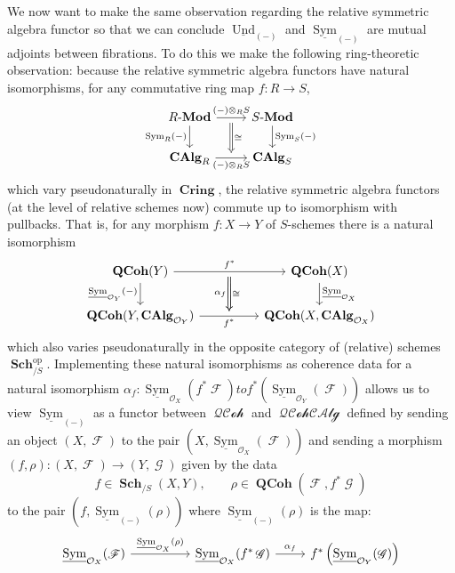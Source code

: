 \documentclass{amsart}
\theoremstyle{definition}
\DeclareMathOperator{\Fscr}{\mathscr{F}}
\DeclareMathOperator{\Gscr}{\mathscr{G}}
\DeclareMathOperator{\Ocal}{\mathcal{O}}
\DeclareMathOperator{\sym}{Sym}
\DeclareMathOperator{\Cring}{\mathbf{Cring}}
\DeclareMathOperator{\op}{op}
\DeclareMathOperator{\und}{Und}
\newcommand{\CAlg}[1]{\mathbf{CAlg}_{#1}}
\newcommand{\Sym}[1]{\sym_{#1}}
\newcommand{\RelSym}[1]{\underline{\sym}_{{#1}}}
\newcommand{\RelUnd}[1]{\underline{\und}_{{#1}}}
\DeclareMathOperator{\Sch}{\mathbf{Sch}}
\DeclareMathOperator{\QCoh}{\mathbf{QCoh}}
\DeclareMathOperator{\QQCoh}{\mathcal{QCoh}}
\DeclareMathOperator{\QQCAlg}{\mathcal{QCohCAlg}}
\newcommand{\Mod}[1]{{#1}\textnormal{-}\mathbf{Mod}}
\numberwithin{equation}{subsection}
\begin{document}
We now want to make the same observation regarding the relative symmetric algebra functor so that we can conclude $\RelUnd{(-)}$ and $\RelSym{(-)}$ are mutual adjoints between fibrations. To do this we make the following ring-theoretic observation: because the relative symmetric algebra functors have natural isomorphisms, for any commutative ring map $f:R \to S$,
\[
\begin{tikzcd} 
\Mod{R}  \ar[d, swap]{}{\Sym{R}(-)} \ar[r, ""{name = U}]{}{(-) \otimes_R S} & \Mod{S} \ar[d]{}{\Sym{S}(-)}	\\
\CAlg{R} \ar[r, swap, ""{name = D}]{}{(-) \otimes_R S} & \CAlg{S}
\ar[from = U, to = D, Rightarrow, shorten <= 4pt, shorten >= 4pt]{}{\cong}
\end{tikzcd}
\]
which vary pseudonaturally in $\Cring$, the relative symmetric algebra functors (at the level of relative schemes now) commute up to isomorphism with pullbacks. That is, for any morphism $f:X \to Y$ of $S$-schemes there is a natural isomorphism
\[
\begin{tikzcd}
\QCoh(Y) \ar[rr, ""{name = U}]{}{f^{\ast}} \ar[d, swap]{}{\RelSym{\Ocal_Y}(-)} & & \QCoh(X) \ar[d]{}{\RelSym{\Ocal_X}} \\
\QCoh(Y, \CAlg{\Ocal_Y}) \ar[rr, swap, ""{name = D}]{}{f^{\ast}} & & \QCoh(X,\CAlg{\Ocal_X})
\ar[from = U, to = D, Rightarrow, shorten <= 4pt, shorten >= 4pt]{}{\cong}
\ar[from = U, to = D, Rightarrow, shorten <= 4pt, shorten >= 4pt, swap]{}{\alpha_f}
\end{tikzcd}
\]
which also varies pseudonaturally in the opposite category of (relative) schemes $\Sch_{/S}^{\op}$. Implementing these natural isomorphisms as coherence data for a natural isomorphism $\alpha_f:\RelSym{\Ocal_X}(f^{\ast}\Fscr) to f^{\ast}(\RelSym{\Ocal_Y}(\Fscr))$
allows us to view $\RelSym{(-)}$ as a functor between $\QQCoh$ and $\QQCAlg$ defined by sending an object $(X,\Fscr)$ to the pair $(X,\RelSym{\Ocal_X}(\Fscr))$ and sending a morphism $(f,\rho):(X,\Fscr) \to (Y,\Gscr)$ given by the data
\[
f \in \Sch_{/S}(X,Y), \qquad \rho \in \QCoh(\Fscr, f^{\ast}\Gscr)
\] 
to the pair $(f,\RelSym{(-)}(\rho))$ where $\RelSym{(-)}(\rho)$ is the map:
\[
\begin{tikzcd}
\RelSym{\Ocal_X}(\Fscr) \ar[rr]{}{\RelSym{\Ocal_X}(\rho)} & & \RelSym{\Ocal_X}(f^{\ast}\Gscr) \ar[r]{}{\alpha_f} & f^{\ast}\left(\RelSym{\Ocal_Y}(\Gscr)\right)
\end{tikzcd}
\]
\end{document}
